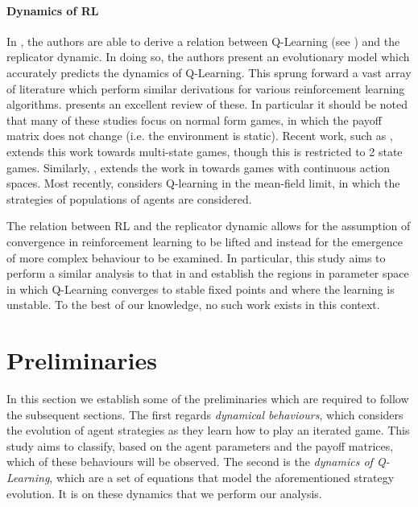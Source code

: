 \documentclass[sigconf,anonymous]{aamas}
\begin{document}
\paragraph{Dynamics of RL} In \cite{Tuyls2006AnGames}, the authors are able to derive a relation between Q-Learning (see \cite{Barber2012}) and the replicator dynamic. In doing so, the authors present an evolutionary model which accurately predicts the dynamics of Q-Learning. This sprung forward a vast array of literature which perform similar derivations for various reinforcement learning algorithms. \cite{Bloembergen2015} presents an excellent review of these. In particular it should be noted that many of these studies focus on normal form games, in which the payoff matrix does not change (i.e. the environment is static). Recent work, such as \cite{Hennes2008}, extends this work towards multi-state games, though this is restricted to 2 state games. Similarly, \cite{Galstyan2013}, extends the work in \cite{Tuyls2006AnGames} towards games with continuous action spaces. Most recently, \cite{Hu2019} considers Q-learning in the mean-field limit, in which the strategies of populations of agents are considered. 

The relation between RL and the replicator dynamic allows for the assumption of convergence in reinforcement learning to be lifted and instead for the emergence of more complex behaviour to be examined. In particular, this study aims to perform a similar analysis to that in \cite{Sanders2018} and establish the regions in parameter space in which Q-Learning converges to stable fixed points and where the learning is unstable. To the best of our knowledge, no such work exists in this context. 

\section{Preliminaries}

In this section we establish some of the preliminaries which
are required to follow the subsequent sections. The first regards
\textit{dynamical behaviours}, which considers the evolution of agent
strategies as they learn how to play an iterated game. This study aims to
classify, based on the agent parameters and the payoff matrices, which
of these behaviours will be observed. The second is the \textit{dynamics
  of Q-Learning}, which are a set of equations that model the
aforementioned strategy evolution. It is on these dynamics that we
perform our analysis.
\end{document}
